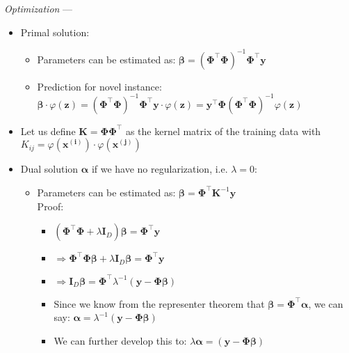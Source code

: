 \emph{Optimization} ---
\begin{itemize}
    \item Primal solution:
    \begin{itemize}
        \item Parameters can be estimated as: $\boldsymbol{\beta} = (\boldsymbol{\Phi}^\intercal \boldsymbol{\Phi})^{-1}  \boldsymbol{\Phi}^\intercal \boldsymbol{y}$
        \item Prediction for novel instance: $\boldsymbol{\beta} \cdot \varphi({\boldsymbol{z}}) = (\boldsymbol{\Phi}^\intercal \boldsymbol{\Phi})^{-1}  \boldsymbol{\Phi}^\intercal \boldsymbol{y} \cdot \varphi({\boldsymbol{z}}) = \boldsymbol{y}^\intercal \boldsymbol{\Phi} (\boldsymbol{\Phi}^\intercal \boldsymbol{\Phi})^{-1} \varphi({\boldsymbol{z}}) $
    \end{itemize}
    \item Let us define $\boldsymbol{K} = \boldsymbol{\Phi} \boldsymbol{\Phi}^\intercal$ as the kernel matrix of the training data with $K_{ij} = \varphi(\boldsymbol{x^{(i)}}) \cdot \varphi(\boldsymbol{x^{(j)}})$
    \item Dual solution $\boldsymbol{\alpha}$ if we have no regularization, i.e. $\lambda = 0$:
    \begin{itemize}
        \item Parameters can be estimated as: $\boldsymbol{\beta} =  \boldsymbol{\Phi}^\intercal \boldsymbol{K}^{-1} \boldsymbol{y}$\\
        Proof:
        \begin{itemize}
            \item $(\boldsymbol{\Phi}^\intercal \boldsymbol{\Phi} + \lambda \boldsymbol{I}_D) \boldsymbol{\beta} = \boldsymbol{\Phi}^\intercal \boldsymbol{y}$
            \item $\Rightarrow \boldsymbol{\Phi}^\intercal \boldsymbol{\Phi} \boldsymbol{\beta} + \lambda \boldsymbol{I}_D \boldsymbol{\beta} = \boldsymbol{\Phi}^\intercal \boldsymbol{y}$
            \item $\Rightarrow \boldsymbol{I}_D \boldsymbol{\beta} = \boldsymbol{\Phi}^\intercal \lambda^{-1}  (\boldsymbol{y} - \boldsymbol{\Phi} \boldsymbol{\beta})$
            \item Since we know from the representer theorem that $\boldsymbol{\beta} = \boldsymbol{\Phi}^\intercal \boldsymbol{\alpha}$, we can say: $\boldsymbol{\alpha} = \lambda^{-1}  (\boldsymbol{y} - \boldsymbol{\Phi} \boldsymbol{\beta})$ 
            \item We can further develop this to: $\lambda \boldsymbol{\alpha} = (\boldsymbol{y} - \boldsymbol{\Phi} \boldsymbol{\beta})$

\end{itemize}
\end{itemize}
\end{itemize}
